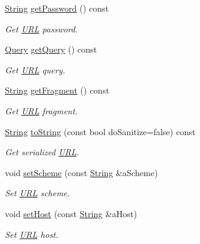 \begin{DoxyCompactItemize}
\hyperlink{namespacelibrary_1_1io_a7469b45835a4421045db344d6a5a1f85}{String} \hyperlink{classlibrary_1_1io_1_1_u_r_l_a5d8c1d85b26f35d95153a2ed1f45e578}{get\+Password} () const
\begin{DoxyCompactList}\small\item\em Get \hyperlink{classlibrary_1_1io_1_1_u_r_l}{U\+RL} password. \end{DoxyCompactList}\item 
\hyperlink{namespacelibrary_1_1io_a39ebaf2265de78ba79eb5347f2af61b3}{Query} \hyperlink{classlibrary_1_1io_1_1_u_r_l_a9e2dfc922d148118443d8247679a28c1}{get\+Query} () const
\begin{DoxyCompactList}\small\item\em Get \hyperlink{classlibrary_1_1io_1_1_u_r_l}{U\+RL} query. \end{DoxyCompactList}\item 
\hyperlink{namespacelibrary_1_1io_a7469b45835a4421045db344d6a5a1f85}{String} \hyperlink{classlibrary_1_1io_1_1_u_r_l_acf491cea3422f7dc8576fff7431c3a0b}{get\+Fragment} () const
\begin{DoxyCompactList}\small\item\em Get \hyperlink{classlibrary_1_1io_1_1_u_r_l}{U\+RL} fragment. \end{DoxyCompactList}\item 
\hyperlink{namespacelibrary_1_1io_a7469b45835a4421045db344d6a5a1f85}{String} \hyperlink{classlibrary_1_1io_1_1_u_r_l_a0d6ace28a1ecbc7f5d8bffb3aa2a2431}{to\+String} (const bool do\+Sanitize=false) const
\begin{DoxyCompactList}\small\item\em Get serialized \hyperlink{classlibrary_1_1io_1_1_u_r_l}{U\+RL}. \end{DoxyCompactList}\item 
void \hyperlink{classlibrary_1_1io_1_1_u_r_l_a8905d2ff07fe8aeebaaee71621a0f6f2}{set\+Scheme} (const \hyperlink{namespacelibrary_1_1io_a7469b45835a4421045db344d6a5a1f85}{String} \&a\+Scheme)
\begin{DoxyCompactList}\small\item\em Set \hyperlink{classlibrary_1_1io_1_1_u_r_l}{U\+RL} scheme. \end{DoxyCompactList}\item 
void \hyperlink{classlibrary_1_1io_1_1_u_r_l_ab11ded07b47b35dbc0bb6907c0cfd5c5}{set\+Host} (const \hyperlink{namespacelibrary_1_1io_a7469b45835a4421045db344d6a5a1f85}{String} \&a\+Host)
\begin{DoxyCompactList}\small\item\em Set \hyperlink{classlibrary_1_1io_1_1_u_r_l}{U\+RL} host. \end{DoxyCompactList}\item 

\end{DoxyCompactItemize}
